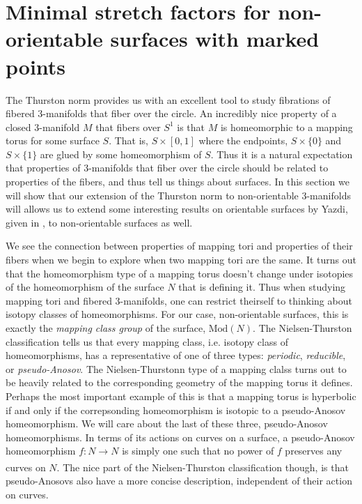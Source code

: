 \section{Minimal stretch factors for non-orientable surfaces with marked points}
\label{sec:application}


The Thurston norm provides us with an excellent tool to study fibrations of fibered 3-manifolds that fiber over the circle. An incredibly nice property of a closed 3-manifold $M$ that fibers over $S^1$ is that $M$ is homeomorphic to a mapping torus for some surface $S$. That is, $S \times [0,1]$ where the endpoints, $S \times \{0\}$ and $S \times \{1\}$ are glued by some homeomorphism of $S$. Thus it is a natural expectation that properties of 3-manifolds that fiber over the circle should be related to properties of the fibers, and thus tell us things about surfaces. In this section we will show that our extension of the Thurston norm to non-orientable 3-manifolds will allows us to extend some interesting results on orientable surfaces by Yazdi, given in \cite{yazdi2018pseudo}, to non-orientable surfaces as well.

We see the connection between properties of mapping tori and properties of their fibers when we begin to explore when two mapping tori are the same. It turns out that the homeomorphism type of a mapping torus doesn't change under isotopies of the homeomorphism of the surface $N$ that is defining it. Thus when studying mapping tori and fibered 3-manifolds, one can restrict theirself to thinking about isotopy classes of homeomorphisms. For our case, non-orientable surfaces, this is exactly the \textit{mapping class group} of the surface, $\text{Mod}(N)$. The Nielsen-Thurston classification tells us that every mapping class, i.e. isotopy class of homeomorphisms, has a representative of one of three types: \textit{periodic}, \textit{reducible}, or \textit{pseudo-Anosov}. The Nielsen-Thurstonn type of a mapping clalss turns out to be heavily related to the corresponding geometry of the mapping torus it defines. Perhaps the most important example of this is that a mapping torus is hyperbolic if and only if the correpsonding homeomorphism is isotopic to a pseudo-Anosov homeomorphism. We will care about the last of these three, pseudo-Anosov homeomorphisms. In terms of its actions on curves on a surface, a pseudo-Anosov homeomorphism $f: N \xrightarrow[]{} N$ is simply one such that no power of $f$ preserves any curves on $N$. The nice part of the Nielsen-Thurston classification though, is that pseudo-Anosovs also have a more concise description, independent of their action on curves.

